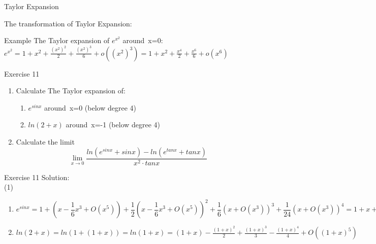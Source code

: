 \begin{frame}{Taylor Expansion}


    The transformation of Taylor Expansion:
    \begin{block}{Example}
        The Taylor expansion of $e^{x^2}$ around\ x=0:\\
        $e^{x^2}=1+x^2+\frac{(x^2)^2}{2}+\frac{(x^2)^3}{6}+o((x^2)^3)=1+x^2+\frac{x^4}{2}+\frac{x^6}{6}+o(x^6)$
    \end{block}


\end{frame}


\begin{frame}{Exercise 11}
    \begin{block}{}
        \begin{enumerate}
            \item Calculate The Taylor expansion of:\\
                  \begin{enumerate}
                      \item $e^{sinx}$ around\ x=0 (below degree 4)
                      \item $ln(2+x)$ around\ x=-1 (below degree 4)
                  \end{enumerate}
            \item Calculate the limit $$\lim\limits_{x\to 0}\frac{ln(e^{sinx}+sinx)-ln(e^{tanx}+tanx)}{x^2\cdot tanx}$$
        \end{enumerate}

    \end{block}

\end{frame}


\begin{frame}{Exercise 11}
    \small
    Solution:\\
    (1)\\
    \begin{enumerate}
        \item $e^{sinx}=1+(x-\dfrac{1}{6}x^3+O(x^5))+\dfrac{1}{2}(x-\dfrac{1}{6}x^3+O(x^5))^2+\dfrac{1}{6}(x+O(x^3))^3+\dfrac{1}{24}(x+O(x^3))^4=1+x+\dfrac{x^2}{2}-\dfrac{x^4}{8}+O(x^5)$
        \item $ln(2+x)=ln(1+(1+x))=ln(1+x)=(1+x)-\frac{(1+x)^2}{2}+\frac{(1+x)^3}{3}-\frac{(1+x)^4}{4}+O((1+x)^5)$
    \end{enumerate}
\end{frame}


